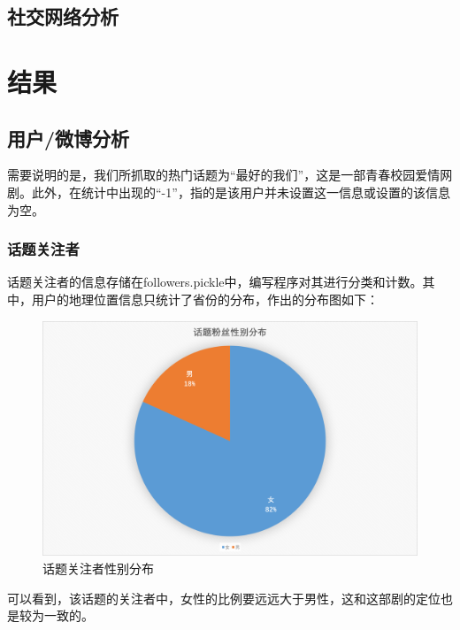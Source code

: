 \documentclass[a4paper,UTF8]{ctexart}
\begin{document}
\subsection{社交网络分析}


\section{结果}

\subsection{用户/微博分析}

需要说明的是，我们所抓取的热门话题为“最好的我们”，这是一部青春校园爱情网剧。此外，在统计中出现的“-1”，指的是该用户并未设置这一信息或设置的该信息为空。

\subsubsection{话题关注者}

话题关注者的信息存储在followers.pickle中，编写程序对其进行分类和计数。其中，用户的地理位置信息只统计了省份的分布，作出的分布图如下：
\begin{figure}[H]
      \centering
      \includegraphics[width = \textwidth]{img/followers_gender.png}
      \caption{话题关注者性别分布}
\end{figure}

可以看到，该话题的关注者中，女性的比例要远远大于男性，这和这部剧的定位也是较为一致的。
\end{document}
